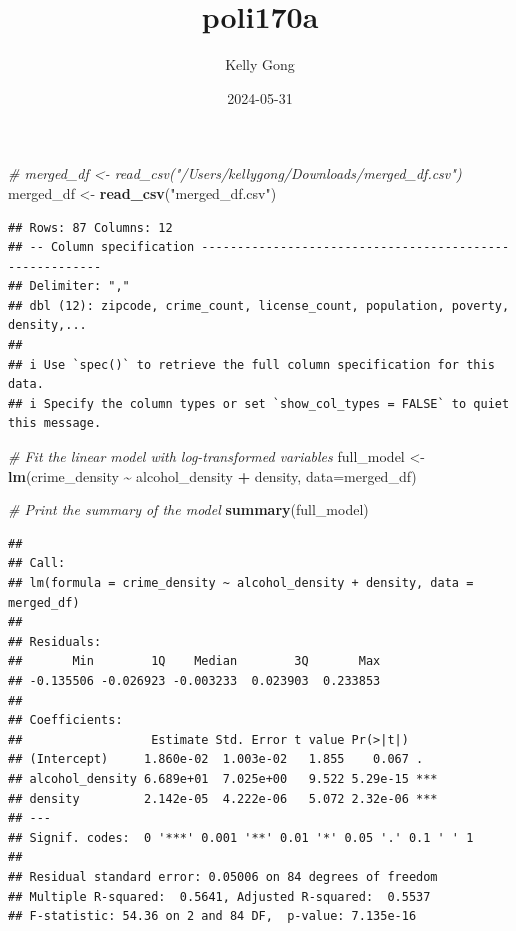 \documentclass[
  landscape]{article}
\title{poli170a}
\author{Kelly Gong}
\date{2024-05-31}
\newenvironment{Shaded}{\begin{snugshade}}{\end{snugshade}}
\newcommand{\AttributeTok}[1]{\textcolor[rgb]{0.13,0.29,0.53}{#1}}
\newcommand{\CommentTok}[1]{\textcolor[rgb]{0.56,0.35,0.01}{\textit{#1}}}
\newcommand{\FunctionTok}[1]{\textcolor[rgb]{0.13,0.29,0.53}{\textbf{#1}}}
\newcommand{\NormalTok}[1]{#1}
\newcommand{\OtherTok}[1]{\textcolor[rgb]{0.56,0.35,0.01}{#1}}
\newcommand{\SpecialCharTok}[1]{\textcolor[rgb]{0.81,0.36,0.00}{\textbf{#1}}}
\newcommand{\StringTok}[1]{\textcolor[rgb]{0.31,0.60,0.02}{#1}}
\begin{document}
\maketitle

\begin{Shaded}
\begin{Highlighting}[]
\CommentTok{\# merged\_df \textless{}{-} read\_csv("/Users/kellygong/Downloads/merged\_df.csv")}
\NormalTok{merged\_df }\OtherTok{\textless{}{-}} \FunctionTok{read\_csv}\NormalTok{(}\StringTok{"merged\_df.csv"}\NormalTok{)}
\end{Highlighting}
\end{Shaded}

\begin{verbatim}
## Rows: 87 Columns: 12
## -- Column specification --------------------------------------------------------
## Delimiter: ","
## dbl (12): zipcode, crime_count, license_count, population, poverty, density,...
## 
## i Use `spec()` to retrieve the full column specification for this data.
## i Specify the column types or set `show_col_types = FALSE` to quiet this message.
\end{verbatim}

\begin{Shaded}
\begin{Highlighting}[]
\CommentTok{\# Fit the linear model with log{-}transformed variables}
\NormalTok{full\_model }\OtherTok{\textless{}{-}} \FunctionTok{lm}\NormalTok{(crime\_density }\SpecialCharTok{\textasciitilde{}}\NormalTok{ alcohol\_density }\SpecialCharTok{+}\NormalTok{ density, }\AttributeTok{data=}\NormalTok{merged\_df)}

\CommentTok{\# Print the summary of the model}
\FunctionTok{summary}\NormalTok{(full\_model)}
\end{Highlighting}
\end{Shaded}

\begin{verbatim}
## 
## Call:
## lm(formula = crime_density ~ alcohol_density + density, data = merged_df)
## 
## Residuals:
##       Min        1Q    Median        3Q       Max 
## -0.135506 -0.026923 -0.003233  0.023903  0.233853 
## 
## Coefficients:
##                  Estimate Std. Error t value Pr(>|t|)    
## (Intercept)     1.860e-02  1.003e-02   1.855    0.067 .  
## alcohol_density 6.689e+01  7.025e+00   9.522 5.29e-15 ***
## density         2.142e-05  4.222e-06   5.072 2.32e-06 ***
## ---
## Signif. codes:  0 '***' 0.001 '**' 0.01 '*' 0.05 '.' 0.1 ' ' 1
## 
## Residual standard error: 0.05006 on 84 degrees of freedom
## Multiple R-squared:  0.5641, Adjusted R-squared:  0.5537 
## F-statistic: 54.36 on 2 and 84 DF,  p-value: 7.135e-16
\end{verbatim}
\end{document}
